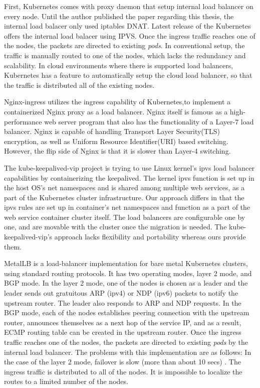 First, Kubernetes comes with proxy daemon that setup internal load balancer on every node.
Until the author published the paper \cite{takahashi2018portable} regarding this thesis, the internal load balacer only used iptables DNAT.
Latest release of the Kubernetes offers the internal load balacer using IPVS.
Once the ingress traffic reaches one of the nodes, the packets are directed to existing {\em pods}.
In conventional setup, the traffic is manually routed to one of the nodes, which lacks the redundancy and scalability.
In cloud environments where there is supported load balancers, Kubernetes has a feature to automatically setup the cloud load balancer, so that the traffic is distributed all of the existing nodes. 

Nginx-ingress\cite{Pleshakov2016,NginxInc2016} utilizes the ingress\cite{K8sIngress2017} capability of Kubernetes,to implement a containerized Nginx proxy as a load balancer.
Nginx itself is famous as a high-performance web server program that also has the functionality of a Layer-7 load balancer.
Nginx is capable of handling Transport Layer Security(TLS) encryption, as well as Uniform Resource Identifier(URI) based switching.
However, the flip side of Nginx is that it is slower than Layer-4 switching.

The kube-keepalived-vip\cite{Prashanth2016} project is trying to use Linux kernel's ipvs\cite{Zhang2000} 
load balancer capabilities by containerizing the keepalived\cite{ACassen2016}.
The kernel ipvs function is set up in the host OS's net namespaces and is shared among multiple web services, as a part of the Kubernetes cluster infrastructure.
Our approach differs in that the ipvs rules are set up in container's net namespaces 
and function as a part of the web service container cluster itself.
The load balancers are configurable one by one, and are  movable with the cluster once the migration is needed.
The kube-keepalived-vip's approach lacks flexibility and portability whereas ours provide them.

MetalLB \cite{metallb} is a load-balancer implementation for bare metal Kubernetes clusters, using standard routing protocols.
It has two operating modes, layer 2 mode, and BGP mode.
In the layer 2 mode, one of the nodes is chosen as a leader and the leader sends out gratuitous ARP (ipv4) or NDP (ipv6) packets to notify the upstream router.
The leader also responds to ARP and NDP requests.
In the BGP mode, each of the nodes establishes peering connection with the upstream router, announces themselves as a next hop of the service IP, and as a result, ECMP routing table can be created in the upstream router.
Once the ingress traffic reaches one of the nodes, the packets are directed to existing {\em pods} by the internal load balancer.
The problems with this implementation are as follows:
In the case of the layer 2 mode, failover is slow (more than about 10 secs) \cite{metallb}.
The ingress traffic is distributed to all of the nodes.
It is impossible to localize the routes to a limited number of the nodes.

